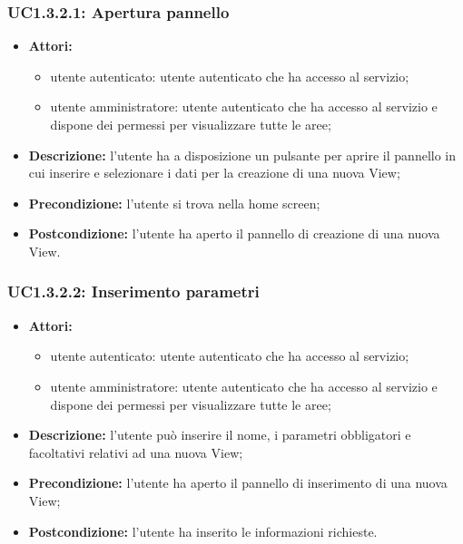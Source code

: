 \subsubsection{UC1.3.2.1: Apertura pannello}

\begin{itemize}
    \item \textbf{Attori:}
    \begin{itemize}
    	\item utente autenticato: utente autenticato che ha accesso al servizio;
    	\item utente amministratore: utente autenticato che ha accesso al servizio e dispone dei permessi per visualizzare tutte le aree;
	\end{itemize}
    \item \textbf{Descrizione:} l'utente ha a disposizione un pulsante per aprire il pannello in cui inserire e selezionare i dati per la creazione di una nuova View;
    \item \textbf{Precondizione:} l'utente si trova nella home screen;
    \item \textbf{Postcondizione:} l'utente ha aperto il pannello di creazione di una nuova View.
\end{itemize}

\subsubsection{UC1.3.2.2: Inserimento parametri}

\begin{itemize}
    \item \textbf{Attori:}
    \begin{itemize}
    	\item utente autenticato: utente autenticato che ha accesso al servizio;
    	\item utente amministratore: utente autenticato che ha accesso al servizio e dispone dei permessi per visualizzare tutte le aree;
	\end{itemize}
    \item \textbf{Descrizione:} l'utente può inserire il nome, i parametri obbligatori e facoltativi relativi ad una nuova View;
    \item \textbf{Precondizione:} l'utente ha aperto il pannello di inserimento di una nuova View;
    \item \textbf{Postcondizione:} l'utente ha inserito le informazioni richieste.
\end{itemize}

